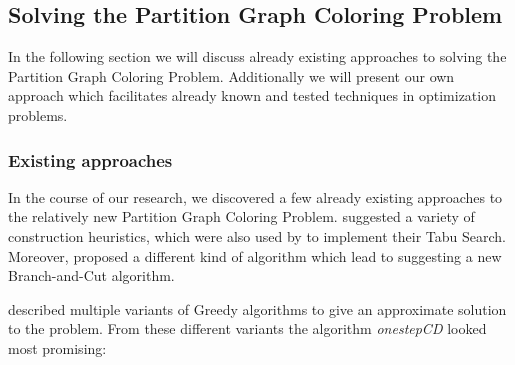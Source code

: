 \documentclass[paper=a4,fontsize=12pt]{scrartcl}
\begin{document}
\subsection{Solving the Partition Graph Coloring Problem}


In the following section we will discuss already existing approaches to solving the Partition Graph Coloring Problem. Additionally we will present our own approach which facilitates already known and tested techniques in optimization problems.


\subsubsection{Existing approaches}


In the course of our research, we discovered a few already existing approaches to the relatively new Partition Graph Coloring Problem. \citet*{Li2000} suggested a variety of construction heuristics, which were also used by \citet*{Noronha2006} to implement their Tabu Search. Moreover, \citet*{Lu2010} proposed a different kind of algorithm which lead to \citet*{Palladino2011} suggesting a new Branch-and-Cut algorithm.


\citet*{Li2000} described multiple variants of Greedy algorithms to give an approximate solution to the problem. From these different variants the algorithm \emph{onestepCD} looked most promising:
\end{document}
